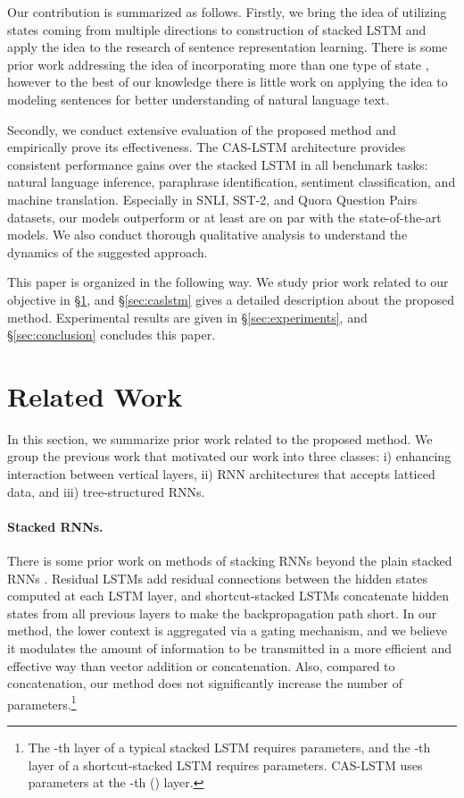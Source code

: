 \documentclass[wcp]{jmlr}
\begin{document}
    Our contribution is summarized as follows.
    Firstly, we bring the idea of utilizing states coming from multiple directions to construction of stacked LSTM and apply the idea to the research of sentence representation learning.
    There is some prior work addressing the idea of incorporating more than one type of state \citep{graves2007mdrnn,kalchbrenner2016grid,zhang2016highway}, however to the best of our knowledge there is little work on applying the idea to modeling sentences for better understanding of natural language text.
    
    Secondly, we conduct extensive evaluation of the proposed method and empirically prove its effectiveness.
    The CAS-LSTM architecture provides consistent performance gains over the stacked LSTM in all benchmark tasks: natural language inference, paraphrase identification, sentiment classification, and machine translation.
    Especially in SNLI, SST-2, and Quora Question Pairs datasets, our models outperform or at least are on par with the state-of-the-art models.
    We also conduct thorough qualitative analysis to understand the dynamics of the suggested approach.
    
    This paper is organized in the following way.
    We study prior work related to our objective in \S\ref{sec:related}, and
    \S\ref{sec:caslstm} gives a detailed description about the proposed method.
    Experimental results are given in \S\ref{sec:experiments}, and 
    \S\ref{sec:conclusion} concludes this paper.
    
    \section{Related Work}
    \label{sec:related}
    In this section, we summarize prior work related to the proposed method.
    We group the previous work that motivated our work into three classes: i) enhancing interaction between vertical layers, ii) RNN architectures that accepts latticed data, and iii) tree-structured RNNs.
    
    \paragraph{Stacked RNNs.}
    There is some prior work on methods of stacking RNNs beyond the plain stacked RNNs \citep{schmidhuber1992learning,el1996hierarchical}.
    Residual LSTMs \citep{kim2017residual,tran2017stack} add residual connections between the hidden states computed at each LSTM layer, and shortcut-stacked LSTMs \citep{nie2017shortcut} concatenate hidden states from all previous layers to make the backpropagation path short.
    In our method, the lower context is aggregated via a gating mechanism, and we believe it modulates the amount of information to be transmitted in a more efficient and effective way than vector addition or concatenation.
    Also, compared to concatenation, our method does not significantly increase the number of parameters.\footnote{The -th layer of a typical stacked LSTM requires  parameters, and the -th layer of a shortcut-stacked LSTM requires  parameters. CAS-LSTM uses  parameters at the -th () layer.}
    
\end{document}
